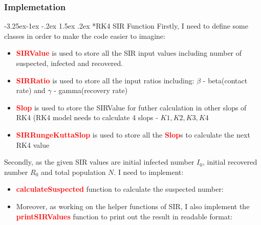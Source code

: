 \documentclass[a4paper]{article}
\makeatletter
\newcounter {subsubsubsection}[subsubsection]
\newcommand\subsubsubsection{\@startsection{subsubsubsection}{4}{\z@}%
                                     {-3.25ex\@plus -1ex \@minus -.2ex}%
                                     {1.5ex \@plus .2ex}%
                                     {\normalfont\normalsize\bfseries}}
\makeatother
\begin{document}
        \subsubsection{Implemetation}
        \subsubsubsection*{RK4 SIR Function}
        Firstly, I need to define some classes in order to make the code easier to imagine:
        \begin{itemize}
            \item \textbf{\textcolor{red}{SIRValue}} is used to store all the SIR input values including number of suspected, infected and recovered.
            
            
            \item \textbf{\textcolor{red}{SIRRatio}} is used to store all the input ratios including: $\beta$ - beta(contact rate) and $\gamma$ - gamma(recovery rate)
            
            
            \item \textbf{\textcolor{red}{Slop}} is used to store the SIRValue for futher calculation in other slops of RK4 (RK4 model needs to calculate 4 slops - $K1, K2, K3, K4$
            
            
            \item \textbf{\textcolor{red}{SIRRungeKuttaSlop}} is used to store all the \textbf{\textcolor{red}{Slop}}s to calculate the next RK4 value
            
        \end{itemize}
        
        Secondly, as the given SIR values are initial infected number $I_0$, initial recovered number $R_0$ and total population $N$. I need to implement:
        \begin{itemize}
            \item \textbf{\textcolor{red}{calculateSuspected}} function to calculate the suspected number:
            
            
            \item Moreover, as working on the helper functions of SIR, I also implement the \textbf{\textcolor{red}{printSIRValues}} function to print out the result in readable format:
            
        \end{itemize}
        
\end{document}
